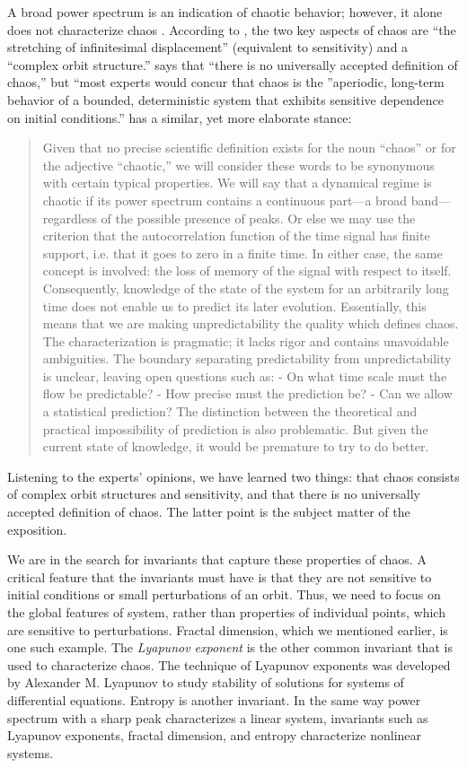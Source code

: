 \documentclass[10pt,twoside]{book}
\begin{document}
A broad power spectrum is an indication of chaotic behavior; however, it alone does not characterize chaos \citep{abarbanel}.
According to \citet[p.31]{ott1994}, the two key aspects of chaos are ``the stretching of infinitesimal displacement'' (equivalent to sensitivity) and a ``complex orbit structure.'' %
\citet[p.104]{sprott} says that ``there is no universally accepted definition of chaos,'' but ``most experts would concur that chaos is the ''aperiodic, long-term behavior of a bounded, deterministic system that exhibits sensitive dependence on initial conditions.''
\citet[p.103]{berge} has a similar, yet more elaborate stance:
\begin{quotation}
  Given that no precise scientific definition exists for the noun ``chaos'' or for the adjective ``chaotic,'' we will consider these words to be synonymous with certain typical properties.
  We will say that a dynamical regime is chaotic if its power spectrum contains a continuous part---a broad band---regardless of the possible presence of peaks.
  Or else we may use the criterion that the autocorrelation function of the time signal has finite support, i.e. that it goes to zero in a finite time.
  In either case, the same concept is involved: the loss of memory of the signal with respect to itself.
  Consequently, knowledge of the state of the system for an arbitrarily long time does not enable us to predict its later evolution.
  Essentially, this means that we are making unpredictability the quality which defines chaos.
  The characterization is pragmatic; it lacks rigor and contains unavoidable ambiguities.
  The boundary separating predictability from unpredictability is unclear, leaving open questions such as:
  - On what time scale must the flow be predictable?
  - How precise must the prediction be?
  - Can we allow a statistical prediction?
  The distinction between the theoretical and practical impossibility of prediction is also problematic.
  But given the current state of knowledge, it would be premature to try to do better.
\end{quotation}
Listening to the experts' opinions, we have learned two things: that chaos consists of complex orbit structures and sensitivity, and that there is no universally accepted definition of chaos.
The latter point is the subject matter of the exposition.


We are in the search for invariants that capture these properties of chaos.
A critical feature that the invariants must have is that they are not sensitive to initial conditions or small perturbations of an orbit.
Thus, we need to focus on the global features of system, rather than properties of individual points, which are sensitive to perturbations.
Fractal dimension, which we mentioned earlier, is one such example.
The \textit{Lyapunov exponent} is the other common invariant that is used to characterize chaos.
The technique of Lyapunov exponents was developed by Alexander M. Lyapunov to study stability of solutions for systems of differential equations.
Entropy is another invariant.
In the same way power spectrum with a sharp peak characterizes a linear system, invariants such as Lyapunov exponents, fractal dimension, and entropy characterize nonlinear systems.
\end{document}
